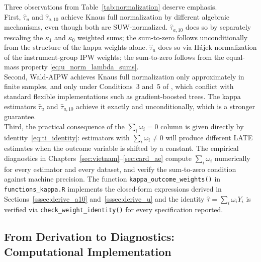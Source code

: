 \documentclass[12pt, a4paper, oneside]{article}
\theoremstyle{plain}
\theoremstyle{definition}
\begin{document}
Three observations from Table~\ref{tab:normalization} deserve emphasis.\\
First, $\hat\tau_u$ and $\hat\tau_{a,10}$ achieve Knaus full normalization by different
algebraic mechanisms, even though both are SUW-normalized. $\hat\tau_{a,10}$ does so by
separately rescaling the $\kappa_1$ and $\kappa_0$ weighted sums; the sum-to-zero
follows unconditionally from the structure of the kappa weights alone. $\hat\tau_u$ does
so via Hájek normalization of the instrument-group IPW weights; the sum-to-zero follows
from the equal-mass property \eqref{eq:u_norm_lambda_sums}.\\
Second, Wald-AIPW achieves Knaus full normalization only approximately in finite samples,
and only under Conditions~3 and~5 of \citet{knaus2024treatment}, which conflict with
standard flexible implementations such as gradient-boosted trees. The kappa estimators
$\hat\tau_u$ and $\hat\tau_{a,10}$ achieve it exactly and unconditionally, which is a
stronger guarantee.\\
Third, the practical consequence of the $\sum_i\omega_i = 0$ column is given directly
by identity~\eqref{eq:ti_identity}: estimators with $\sum_i\omega_i \neq 0$ will produce
different LATE estimates when the outcome variable is shifted by a constant. The
empirical diagnostics in Chapters~\ref{sec:vietnam}--\ref{sec:card_ae} compute
$\sum_i\omega_i$ numerically for every estimator and every dataset, and verify the
sum-to-zero condition against machine precision. The function
\texttt{kappa\_outcome\_weights()} in \texttt{functions\_kappa.R} implements the
closed-form expressions derived in Sections~\ref{sssec:derive_a10}
and~\ref{sssec:derive_u} and the identity $\hat\tau = \sum_i\omega_i Y_i$ is verified
via \texttt{check\_weight\_identity()} for every specification reported.


\subsection{From Derivation to Diagnostics: Computational Implementation}
\label{subsec:implementation}
\end{document}
